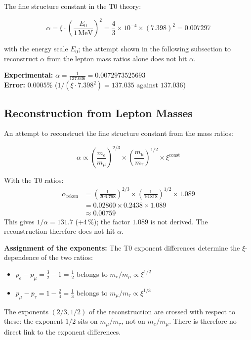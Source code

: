 	The fine structure constant in the T0 theory:
	
	\begin{equation}
		\alpha = \xi \cdot \left(\frac{E_0}{1\,\text{MeV}}\right)^2 = \frac{4}{3} \times 10^{-4} \times (7.398)^2 = 0.007297
	\end{equation}
	
	with the energy scale $E_0$; the attempt shown in the following subsection to reconstruct $\alpha$ from the lepton mass ratios alone does not hit $\alpha$.
	
	\textbf{Experimental:} $\alpha = \frac{1}{137.036} = 0.0072973525693$\\
	\textbf{Error:} $0.0005\%$ ($1/(\xi\cdot7.398^2) = 137.035$ against $137.036$)
	
	\subsection{Reconstruction from Lepton Masses}
	
	\begin{beweis}
		An attempt to reconstruct the fine structure constant from the mass ratios:
		
		\begin{equation}
			\alpha \propto \left(\frac{m_e}{m_\mu}\right)^{2/3} \times \left(\frac{m_\mu}{m_\tau}\right)^{1/2} \times \xi^{\text{const}}
		\end{equation}
		
		With the T0 ratios:
		\begin{align}
			\alpha_{\text{rekon}} &= \left(\frac{1}{206.768}\right)^{2/3} \times \left(\frac{1}{16.818}\right)^{1/2} \times 1.089 \\
			&= 0.02860 \times 0.2438 \times 1.089 \\
			&\approx 0.00759
		\end{align}
		This gives $1/\alpha = 131.7$ ($+4\,\%$); the factor $1.089$ is not derived. The reconstruction therefore does not hit $\alpha$.
	\end{beweis}
	
	\textbf{Assignment of the exponents:} The T0 exponent differences determine the $\xi$-dependence of the two ratios:
	\begin{itemize}
		\item $p_e - p_\mu = \frac{3}{2} - 1 = \frac{1}{2}$ belongs to $m_e/m_\mu \propto \xi^{1/2}$
		\item $p_\mu - p_\tau = 1 - \frac{2}{3} = \frac{1}{3}$ belongs to $m_\mu/m_\tau \propto \xi^{1/3}$
	\end{itemize}
	The exponents $(2/3, 1/2)$ of the reconstruction are crossed with respect to these: the exponent $1/2$ sits on $m_\mu/m_\tau$, not on $m_e/m_\mu$. There is therefore no direct link to the exponent differences.

